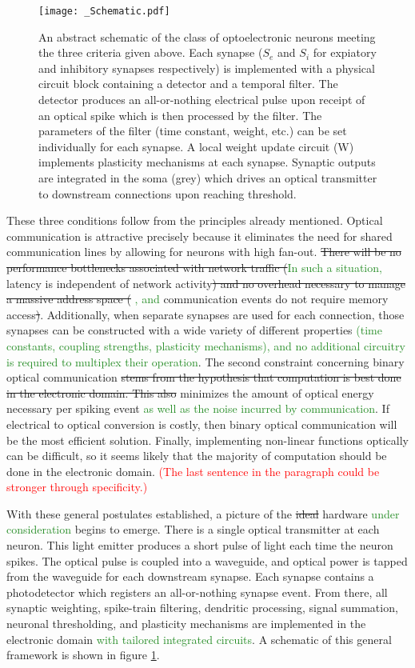 \documentclass[twocolumn]{article}
\begin{document}
\begin{figure}
    \centering
    \texttt{[image: \_Schematic.pdf]}
    \caption{An abstract schematic of the class of optoelectronic neurons meeting the three criteria given above. Each synapse ($S_e$ and $S_i$ for expiatory and inhibitory synapses respectively) is implemented with a physical circuit block containing a detector and a temporal filter. The detector produces an all-or-nothing electrical pulse upon receipt of an optical spike which is then processed by the filter. The parameters of the filter (time constant, weight, etc.) can be set individually for each synapse. A local weight update circuit (W) implements plasticity mechanisms at each synapse. Synaptic outputs are integrated in the soma (grey) which drives an optical transmitter to downstream connections upon reaching threshold.}
    \label{fig:Schematic}
\end{figure}

These three conditions follow from the principles already mentioned. Optical communication is attractive precisely because it eliminates the need for shared communication lines by allowing for neurons with high fan-out. \sout{There will be no performance bottlenecks associated with network traffic (}\textcolor{ForestGreen}{In such a situation, }latency is independent of network activity\sout{) and no overhead necessary to manage a massive address space (} \textcolor{ForestGreen}{, and }communication events do not require memory access\sout{)}. Additionally, when separate synapses are used for each connection, those synapses can be constructed with a wide variety of different properties \textcolor{ForestGreen}{(time constants, coupling strengths, plasticity mechanisms), and no additional circuitry is required to multiplex their operation}. The second constraint concerning binary optical communication \sout{stems from the hypothesis that computation is best done in the electronic domain. This also} minimizes the amount of optical energy necessary per spiking event \textcolor{ForestGreen}{as well as the noise incurred by communication}. If electrical to optical conversion is costly, then binary optical communication will be the most efficient solution. Finally, implementing non-linear functions optically can be difficult, so it seems likely that the majority of computation should be done in the electronic domain. \textcolor{red}{(The last sentence in the paragraph could be stronger through specificity.)}

With these general postulates established, a picture of the \sout{ideal} hardware \textcolor{ForestGreen}{under consideration} begins to emerge. There is a single optical transmitter at each neuron. This light emitter produces a short pulse of light each time the neuron spikes. The optical pulse is coupled into a waveguide, and optical power is tapped from the waveguide for each downstream synapse. Each synapse contains a photodetector which registers an all-or-nothing synapse event. From there, all synaptic weighting, spike-train filtering, dendritic processing, signal summation, neuronal thresholding, and plasticity mechanisms are implemented in the electronic domain \textcolor{ForestGreen}{with tailored integrated circuits}. A schematic of this general framework is shown in figure \ref{fig:Schematic}.
\end{document}
